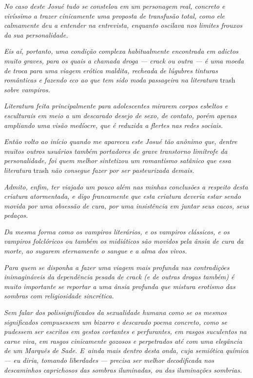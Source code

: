 \emph{No caso deste Josué tudo se constelou em um personagem real,
concreto e vivíssimo a trazer cinicamente uma proposta de transfusão
total, como ele calmamente deu a entender na entrevista, enquanto
oscilava nos limites frouxos da sua personalidade.}

\emph{Eis aí, portanto, uma condição complexa habitualmente encontrada
em adictos muito graves, para os quais a chamada droga --- crack ou outra
--- é uma moeda de troca para uma viagem erótica maldita, recheada de
lúgubres tinturas românticas e fazendo eco ao que tem sido moda
passageira na literatura} trash \emph{sobre vampiros.}

\emph{Literatura feita principalmente para adolescentes mirarem corpos
esbeltos e esculturais em meio a um descarado desejo de sexo, de
contato, porém apenas ampliando uma visão medíocre, que é reduzida a
flertes nas redes sociais.}

\emph{Então volto ao início quando me apareceu este Josué tão anônimo
que, dentre muitos outros usuários também portadores de grave transtorno
limítrofe da personalidade, foi quem melhor sintetizou um romantismo
satânico que essa literatura} trash \emph{não consegue fazer por ser
pasteurizada demais.}

\emph{Admito, enfim, ter viajado um pouco além nas minhas conclusões a
respeito desta criatura atormentada, e digo francamente que esta
criatura deveria estar sendo movida por uma obsessão de cura, por uma
insistência em juntar seus cacos, seus pedaços.}

\emph{Da mesma forma como os vampiros literários, e os vampiros
clássicos, e os vampiros folclóricos ou também os midiáticos são movidos
pela ânsia de cura da morte, ao sugarem eternamente o sangue e a alma
dos vivos.}

\emph{Para quem se disponha a fazer uma viagem mais profunda nas
contradições inimagináveis da dependência pesada de crack (e de outras
drogas também) é muito importante se reportar a uma ânsia profunda que
mistura erotismo das sombras com religiosidade sincrética.}

\emph{Sem falar dos polissignificados da sexualidade humana como se os
mesmos significados compusessem um bizarro e descarado poema concreto,
como se pudessem ser escritos em gestos cortantes e perfurantes, em
rasgos suculentos na carne viva, em rasgos cinicamente gozosos e
perpetrados até com uma elegância de um Marquês de Sade. E~ainda mais
dentro desta onda, cuja semiótica química --- eu diria, tomando
liberdades --- precisa ser melhor decodificada nos descaminhos
caprichosos das sombras iluminadas, ou das iluminações sombrias.}

